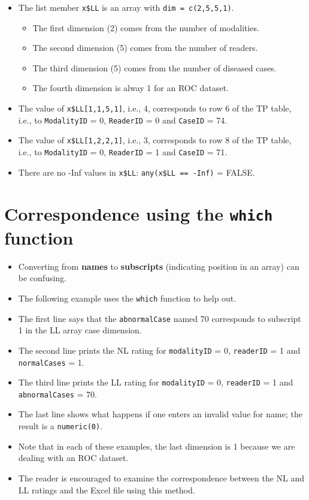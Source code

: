 \documentclass[
]{book}
\providecommand{\tightlist}{%
  \setlength{\itemsep}{0pt}\setlength{\parskip}{0pt}}
\begin{document}
\begin{itemize}
\tightlist
\item
  The list member \texttt{x\$LL} is an array with \texttt{dim\ =\ c(2,5,5,1)}.

  \begin{itemize}
  \tightlist
  \item
    The first dimension (2) comes from the number of modalities.
  \item
    The second dimension (5) comes from the number of readers.
  \item
    The third dimension (5) comes from the number of diseased cases.
  \item
    The fourth dimension is alway 1 for an ROC dataset.
  \end{itemize}
\item
  The value of \texttt{x\$LL{[}1,1,5,1{]}}, i.e., 4, corresponds to row 6 of the TP table, i.e., to \texttt{ModalityID} = 0, \texttt{ReaderID} = 0 and \texttt{CaseID} = 74.
\item
  The value of \texttt{x\$LL{[}1,2,2,1{]}}, i.e., 3, corresponds to row 8 of the TP table, i.e., to \texttt{ModalityID} = 0, \texttt{ReaderID} = 1 and \texttt{CaseID} = 71.
\item
  There are no -Inf values in \texttt{x\$LL}: \texttt{any(x\$LL\ ==\ -Inf)} = FALSE.
\end{itemize}

\hypertarget{correspondence-using-the-which-function}{%
\section{\texorpdfstring{Correspondence using the \texttt{which} function}{Correspondence using the which function}}\label{correspondence-using-the-which-function}}

\begin{itemize}
\tightlist
\item
  Converting from \textbf{names} to \textbf{subscripts} (indicating position in an array) can be confusing.
\item
  The following example uses the \texttt{which} function to help out.
\item
  The first line says that the \texttt{abnormalCase} named 70 corresponds to subscript 1 in the LL array case dimension.
\item
  The second line prints the NL rating for \texttt{modalityID} = 0, \texttt{readerID} = 1 and \texttt{normalCases} = 1.
\item
  The third line prints the LL rating for \texttt{modalityID} = 0, \texttt{readerID} = 1 and \texttt{abnormalCases} = 70.
\item
  The last line shows what happens if one enters an invalid value for name; the result is a \texttt{numeric(0)}.
\item
  Note that in each of these examples, the last dimension is 1 because we are dealing with an ROC dataset.
\item
  The reader is encouraged to examine the correspondence between the NL and LL ratings and the Excel file using this method.
\end{itemize}
\end{document}
